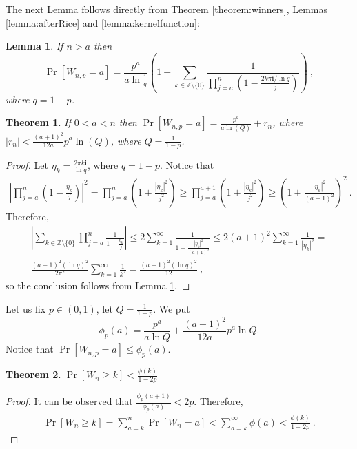\documentclass[proceedings]{dmtcs}
\newtheorem{lemma}{Lemma}
\newtheorem{theorem}{Theorem}
\newcommand{\ZZ}{\mathbb{Z}}
\begin{document}
\noindent
The next Lemma follows directly from Theorem \ref{theorem:winners}, Lemmas \ref{lemma:afterRice} and  \ref{lemma:kernelfunction}:  
\begin{lemma}
\label{lemma:probability}
If $n>a$ then
$$
  \Pr[W_{n,p}=a] = \frac{p^a}{a \ln \frac1q} \left(1+ \sum_{k\in\ZZ\setminus\{0\}} \frac{1}{\prod_{j=a}^{n} 
	(1 - \frac{2 k \pi \mathbf{i}/\ln q}{j})} \right) ~,
$$
where $q = 1-p$.
\end{lemma}


\begin{theorem} 
\label{thm:finalappro}
If $0< a < n$ then 
$\Pr[W_{n,p}=a] = \frac{p^a}{a\ln(Q)}+r_n$, where $|r_n|<\frac{(a+1)^2}{12a}p^a \ln(Q)$,
where $Q = \frac{1}{1-p}$. 
\end{theorem}

\begin{proof}
Let $\eta_k = \frac{2\pi k \mathbf{i}}{\ln q}$, where $q=1-p$.
Notice that
\begin{gather*}
	\left|\prod_{j=a}^{n}(1-\frac{\eta_k}{j})\right|^2 =  
	\prod_{j=a}^{n}\left(1 + \frac{|\eta_k|^2}{j^2}\right) \geq 
	\prod_{j=a}^{a+1}\left(1 + \frac{|\eta_k|^2}{j^2}\right) \geq
	\left(1+\frac{|\eta_k|^2}{(a+1)^2}\right)^2 ~.
\end{gather*}
Therefore,
\begin{gather*}
\left| \sum_{k\in\ZZ\setminus\{0\}}\prod_{j=a}^{n}\frac{1}{1-\frac{\eta_k}{j}} \right| \leq 
2 \sum_{k=1}^{\infty} \frac{1}{1+\frac{|\eta_k|^2}{(a+1)^2} } \leq
2(a+1)^2 \sum_{k=1}^{\infty} \frac{1}{|\eta_k|^2} = \\
\frac{(a+1)^2(\ln q)^2}{2\pi^2} \sum_{k=1}^{\infty} \frac{1}{k^2} =
\frac{(a+1)^2(\ln q)^2}{12} ~,
\end{gather*}
so the conclusion follows from Lemma \ref{lemma:probability}.
\end{proof}
 
Let  us fix $p \in (0,1)$, let $Q =\frac{1}{1-p}$. We put
$$
\phi_p(a) = \frac{p^a}{a \ln{Q}} + \frac{(a+1)^2}{12 a} p^a \ln{Q}.
$$
Notice that $\Pr[W_{n,p}=a] \leq \phi_p(a)$.
\begin{theorem}
\label{theorem:winnersBound}
 $\Pr[W_n \geq k] < \frac{\phi(k)}{1-2p}$
\end{theorem}
\begin{proof}
It can be observed that $\frac{\phi_p(a+1)}{\phi_p(a)} < 2 p$.  
Therefore,
\begin{gather*}
 \Pr[W_n\geq k]=\sum_{a=k}^n\Pr[W_n=a]<\sum_{a=k}^\infty \phi(a)<\frac{\phi(k)}{1-2p} ~.
\end{gather*}
\end{proof}
\end{document}
